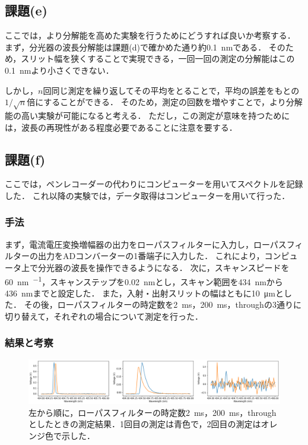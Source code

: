 \documentclass[titlepage]{jsarticle}
\begin{document}
\subsection{課題(e)}
ここでは，より分解能を高めた実験を行うためにどうすれば良いか考察する．
まず，分光器の波長分解能は課題(d)で確かめた通り約\SI{0.1}{\nm}である．
そのため，スリット幅を狭くすることで実現できる，一回一回の測定の分解能はこの\SI{0.1}{\nm}より小さくできない．

しかし，$n$回同じ測定を繰り返してその平均をとることで，平均の誤差をもとの$1/\sqrt{n}$倍にすることができる．
そのため，測定の回数を増やすことで，より分解能の高い実験が可能になると考える．
ただし，この測定が意味を持つためには，波長の再現性がある程度必要であることに注意を要する．

\subsection{課題(f)}
ここでは，ペンレコーダーの代わりにコンピューターを用いてスペクトルを記録した．
これ以降の実験では，データ取得はコンピューターを用いて行った．

\subsubsection{手法}
まず，電流電圧変換増幅器の出力をローパスフィルターに入力し，ローパスフィルターの出力をADコンバーターの1番端子に入力した．
これにより，コンピュータ上で分光器の波長を操作できるようになる．
次に，スキャンスピードを\SI{60}{\nm\per\min}，スキャンステップを\SI{0.02}{\nm}とし，スキャン範囲を\SI{434}{\nm}から\SI{436}{\nm}までと設定した．
また，入射・出射スリットの幅はともに\SI{10}{\um}とした．
その後，ローパスフィルターの時定数を\SI{2}{\ms}，\SI{200}{\ms}，throughの3通りに切り替えて，それぞれの場合について測定を行った．

\subsubsection{結果と考察}

\begin{figure}[htbp]
  \centering
  \includegraphics[width=15cm]{amp.png}
  \caption{左から順に，ローパスフィルターの時定数\SI{2}{\ms}，\SI{200}{\ms}，throughとしたときの測定結果．1回目の測定は青色で，2回目の測定はオレンジ色で示した．}
  \label{fig:amp}
\end{figure}
\end{document}
